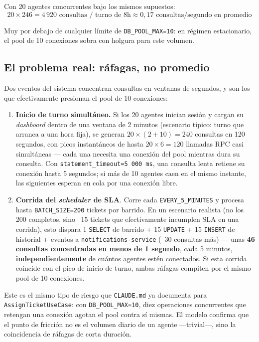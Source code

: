 \documentclass[11pt,a4paper]{article}
\begin{document}
Con 20 agentes concurrentes bajo los mismos supuestos:
\[
20 \times 246 = 4\,920 \text{ consultas / turno de 8h} \approx 0{,}17 \text{ consultas/segundo en promedio}
\]

Muy por debajo de cualquier límite de \texttt{DB\_POOL\_MAX=10}: en
régimen estacionario, el pool de 10 conexiones sobra con holgura para este
volumen.

\subsection{El problema real: ráfagas, no promedio}

Dos eventos del sistema concentran consultas en ventanas de segundos, y son
los que efectivamente presionan el pool de 10 conexiones:

\begin{enumerate}[leftmargin=1.2cm]
  \item \textbf{Inicio de turno simultáneo.} Si los 20 agentes inician
    sesión y cargan su \emph{dashboard} dentro de una ventana de 2 minutos
    (escenario típico: turno que arranca a una hora fija), se generan
    $20 \times (2 + 10) = 240$ consultas en 120 segundos, con picos
    instantáneos de hasta $20 \times 6 = 120$ llamadas RPC casi
    simultáneas — cada una necesita una conexión del pool mientras dura su
    consulta. Con \texttt{statement\_timeout=5\,000\,ms}, una consulta
    lenta retiene su conexión hasta 5 segundos; si más de 10 agentes caen
    en el mismo instante, las siguientes esperan en cola por una conexión
    libre.
  \item \textbf{Corrida del \emph{scheduler} de SLA}. Corre cada
    \texttt{EVERY\_5\_MINUTES} y procesa hasta \texttt{BATCH\_SIZE=200}
    tickets por barrido. En un escenario realista (no los 200 completos,
    sino ~15 tickets que efectivamente incumplen SLA en una corrida), esto
    dispara 1 \texttt{SELECT} de barrido + 15 \texttt{UPDATE} + 15
    \texttt{INSERT} de historial + eventos a \texttt{notifications-service}
    (~30 consultas más) — unas \textbf{46 consultas concentradas en menos
    de 1 segundo}, cada 5 minutos, \textbf{independientemente} de cuántos
    agentes estén conectados. Si esta corrida coincide con el pico de
    inicio de turno, ambas ráfagas compiten por el mismo pool de 10
    conexiones.
\end{enumerate}

Este es el mismo tipo de riesgo que \texttt{CLAUDE.md} ya documenta para
\texttt{AssignTicketUseCase}: con \texttt{DB\_POOL\_MAX=10}, diez
operaciones concurrentes que retengan una conexión agotan el pool contra sí
mismas. El modelo confirma que el punto de fricción no es el volumen diario
de un agente —trivial—, sino la coincidencia de ráfagas de corta duración.
\end{document}
